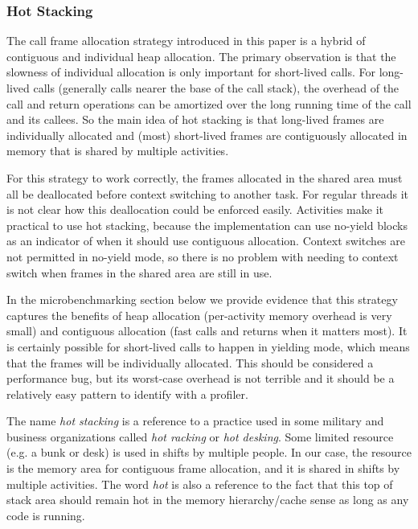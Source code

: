 \documentclass[9pt,preprint]{sigplanconf}
\begin{document}
\subsubsection{Hot Stacking}

The call frame allocation strategy introduced in this paper is a hybrid of contiguous and individual heap allocation.
The primary observation is that the slowness of individual allocation is only important for short-lived calls.
For long-lived calls (generally calls nearer the base of the call stack), the overhead of the call and return operations can be amortized over the long running time of the call and its callees.
So the main idea of hot stacking is that long-lived frames are individually allocated and (most) short-lived frames are contiguously allocated in memory that is shared by multiple activities.

For this strategy to work correctly, the frames allocated in the shared area must all be deallocated before context switching to another task.
For regular threads it is not clear how this deallocation could be enforced easily.
Activities make it practical to use hot stacking, because the implementation can use no-yield blocks as an indicator of when it should use contiguous allocation.
Context switches are not permitted in no-yield mode, so there is no problem with needing to context switch when frames in the shared area are still in use.

In the microbenchmarking section below we provide evidence that this strategy captures the benefits of heap allocation (per-activity memory overhead is very small) and contiguous allocation (fast calls and returns when it matters most).
It is certainly possible for short-lived calls to happen in yielding mode, which means that the frames will be individually allocated.
This should be considered a performance bug, but its worst-case overhead is not terrible and it should be a relatively easy pattern to identify with a profiler.

The name \emph{hot stacking} is a reference to a practice used in some military and business organizations called \emph{hot racking} or \emph{hot desking}.
Some limited resource (e.g. a bunk or desk) is used in shifts by multiple people.
In our case, the resource is the memory area for contiguous frame allocation, and it is shared in shifts by multiple activities.
The word \emph{hot} is also a reference to the fact that this top of stack area should remain hot in the memory hierarchy/cache sense as long as any code is running.
\end{document}
